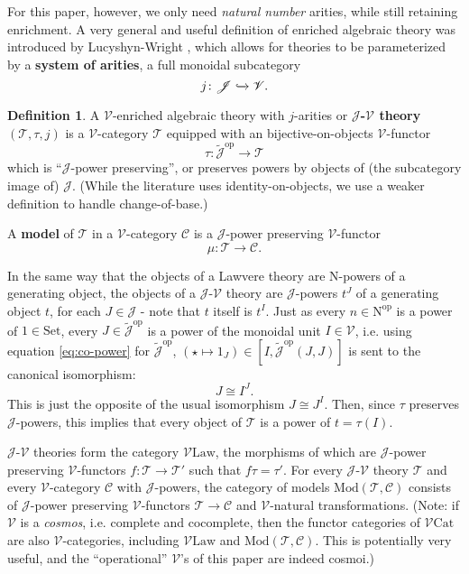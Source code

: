 \documentclass{amsart}
\theoremstyle{definition}
\newtheorem*{definition*}{Definition}
\newcommand{\Set}{\mathrm{Set}}
\newcommand{\Cat}{\mathrm{Cat}}
\newcommand{\Law}{\mathrm{Law}}
\newcommand{\Mod}{\mathrm{Mod}}
\newcommand{\op}{\mathrm{op}}
\newcommand{\NN}{\mathrm{N}}
\newcommand{\V}{\mathscr{V}}
\newcommand{\C}{\mathscr{C}}
\newcommand{\J}{\mathscr{J}}
\newcommand{\T}{\mathscr{T}}
\newcommand{\maps}{\colon}
\begin{document}
For this paper, however, we only need \textit{natural number} arities, while still retaining enrichment. A very general and useful definition of enriched algebraic theory was introduced by Lucyshyn-Wright \cite{rbb}, which allows for theories to be parameterized by a \textbf{system of arities}, a full monoidal subcategory $$j\maps \J \xhookrightarrow{} \V.$$

\begin{definition*}
	A $\V$-enriched algebraic theory with $j$-arities or \textbf{$\J$-$\V$ theory} $(\T,\tau,j)$ is a $\V$-category $\T$ equipped with an bijective-on-objects $\V$-functor $$\tau\maps\tilde{\J}^\op \to \T$$ which is ``$\J$-power preserving'', or preserves powers by objects of (the subcategory image of) $\J$. \newline
	(While the literature uses identity-on-objects, we use a weaker definition to handle change-of-base.)
\end{definition*}

A \textbf{model} of $\T$ in a $\V$-category $\C$ is a $\J$-power preserving $\V$-functor $$\mu: \T \to \C.$$

In the same way that the objects of a Lawvere theory are $\NN$-powers of a generating object, the objects of a $\J$-$\V$ theory are $\J$-powers $t^J$ of a generating object $t$, for each $J \in \J$ - note that $t$ itself is $t^I$. Just as every $n\in \NN^\op$ is a power of $1 \in \Set$, every $J\in \tilde{\J}^{\op}$ is a power of the monoidal unit $I\in \V$, i.e. using equation \ref{eq:co-power} for $\tilde{\J}^{\op}$, $(\star \mapsto 1_J) \in [I,\tilde{\J}^{\op}(J,J)]$ is sent to the canonical isomorphism:
\begin{equation}
J \cong I^J.
\end{equation}
This is just the opposite of the usual isomorphism $J \cong J^I$. Then, since $\tau$ preserves $\J$-powers, this implies that every object of $\T$ is a power of $t = \tau(I)$.

$\J$-$\V$ theories form the category $\V\Law$, the morphisms of which are $\J$-power preserving $\V$-functors $f\maps \T \to \T'$ such that $f\tau = \tau'$. For every $\J$-$\V$ theory $\T$ and every $\V$-category $\C$ with $\J$-powers, the category of models $\Mod(\T,\C)$ consists of $\J$-power preserving $\V$-functors $\T\to \C$ and $\V$-natural transformations. (Note: if $\V$ is a \textit{cosmos}, i.e. complete and cocomplete, then the functor categories of $\V\Cat$ are also $\V$-categories, including $\V\Law$ and $\Mod(\T,\C)$. This is potentially very useful, and the ``operational'' $\V$'s of this paper are indeed cosmoi.)
\end{document}
